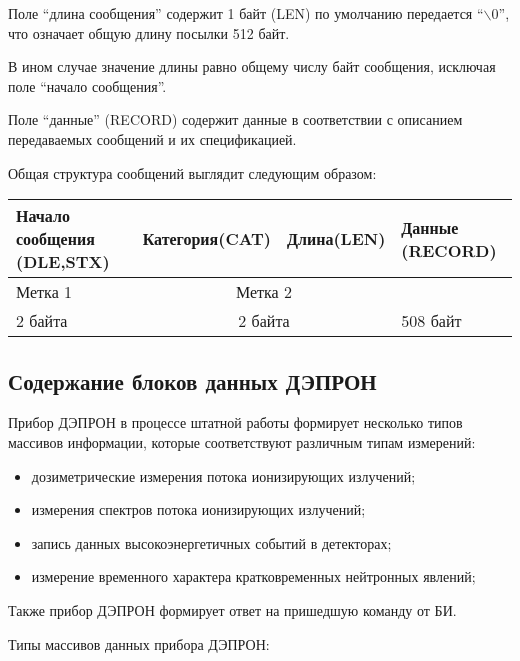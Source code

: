 Поле ``длина сообщения'' содержит 1 байт (LEN) по умолчанию передается ``\ensuremath{\backslash 0}'', что означает общую длину посылки 512 байт.


В ином случае значение длины равно общему числу байт сообщения, исключая поле ``начало сообщения''.


Поле ``данные'' (RECORD) содержит данные в соответствии с описанием передаваемых сообщений и их спецификацией.



Общая структура сообщений выглядит следующим образом:

\begin{tabular}{|p{4.5cm}|c|c|p{2.5cm}|}
	\hline
	Начало сообщения (DLE,STX) & Категория(CAT) & Длина(LEN)  & Данные (RECORD) \\ \hline
	Метка 1                    & \multicolumn{2}{c|}{Метка 2} &  \\ \hline
	2 байта                    & \multicolumn{2}{c|}{2 байта} & {508 байт  }    \\ \hline
\end{tabular}

 
\subsection{Содержание блоков данных ДЭПРОН}

Прибор ДЭПРОН в процессе штатной работы формирует несколько типов массивов информации, которые соответствуют различным типам измерений:


\begin{itemize}
	\item 	дозиметрические измерения потока ионизирующих излучений;
	
	
	\item 	измерения спектров потока ионизирующих излучений;
	
	
	\item 	запись данных высокоэнергетичных событий в детекторах;
	
	
	\item 	измерение временного характера кратковременных нейтронных явлений;
	
	
\end{itemize}
Также прибор ДЭПРОН формирует ответ на пришедшую команду от БИ.





Типы массивов данных прибора ДЭПРОН:


